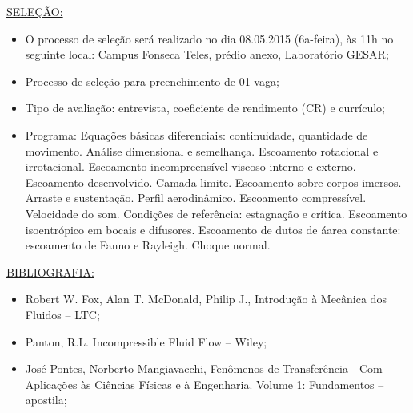 \documentclass[a4paper,portuguese,12pt]{article}
\begin{document}
\underline{SELEÇÃO:}
\begin{itemize}
	\item O processo de seleção será realizado no dia 08.05.2015
	(6a-feira), às 11h no seguinte local: Campus Fonseca Teles, prédio
	anexo, Laboratório GESAR;
	\item Processo de seleção para preenchimento de 01 vaga;
	\item Tipo de avaliação: entrevista, coeficiente de rendimento (CR)
	e currículo;
	\item Programa: Equações básicas diferenciais: continuidade,
	quantidade de movimento. Análise dimensional e semelhança.
	Escoamento rotacional e irrotacional. Escoamento incompreensível
	viscoso interno e externo. Escoamento desenvolvido. Camada limite.
	Escoamento sobre corpos imersos. Arraste e sustentação. Perfil
	aerodinâmico. Escoamento compressível. Velocidade do som. Condições
	de referência: estagnação e crítica. Escoamento isoentrópico em
	bocais e difusores. Escoamento de dutos de áarea constante:
	escoamento de Fanno e Rayleigh. Choque normal.
\end{itemize}

\underline{BIBLIOGRAFIA:}
\begin{itemize}
	\item Robert W. Fox, Alan T. McDonald, Philip J., Introdução à
	Mecânica dos Fluidos -- LTC;
	\item Panton, R.L. Incompressible Fluid Flow -- Wiley;
	\item José Pontes,  Norberto Mangiavacchi, Fenômenos de
	Transferência - Com Aplicações às Ciências Físicas e à Engenharia.
	Volume 1: Fundamentos -- apostila;
\end{itemize}
\end{document}
